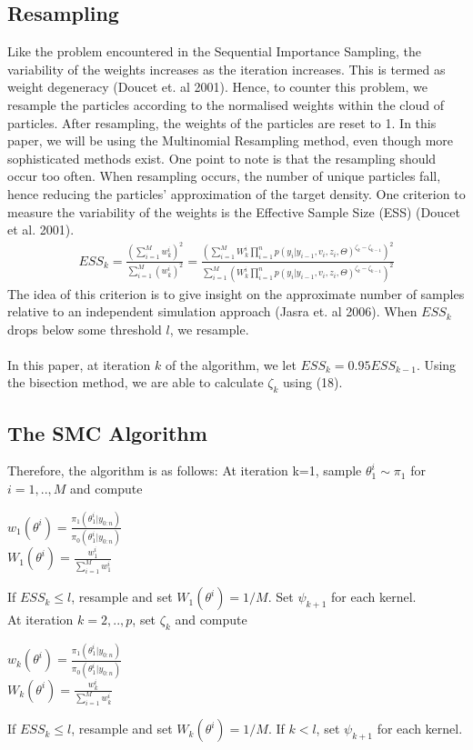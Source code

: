\documentclass[12pt]{article}
\theoremstyle{definition}
\begin{document}
\subsection{Resampling}
Like the problem encountered in the Sequential Importance Sampling, the variability of the weights increases as the iteration increases. This is termed as weight degeneracy (Doucet et. al 2001). Hence, to counter this problem, we resample the particles according to the normalised weights within the cloud of particles. After resampling, the weights of the particles are reset to 1. In this paper, we will be using the Multinomial Resampling method, even though more sophisticated methods exist. One point to note is that the resampling should occur too often. When resampling occurs, the number of unique particles fall, hence reducing the particles' approximation of the target density. One criterion to measure the variability of the weights is the Effective Sample Size (ESS) (Doucet et al. 2001). 
\begin{equation}
	\begin{aligned}
		ESS_{k} = \frac{(\sum_{i=1}^{M} w_{k}^{i})^{2}}{\sum_{i=1}^{M} (w_{k}^{i})^{2}}=
		\frac{(\sum_{i=1}^{M} W_{k}^{i} \prod_{i=1}^{n} p(y_{i}|y_{i-1},v_{i},z_{i},\Theta)^{\zeta_{k}-\zeta_{k-1}})^{2}}{\sum_{i=1}^{M} (W_{k}^{i}\prod_{i=1}^{n} p(y_{i}|y_{i-1},v_{i},z_{i},\Theta)^{\zeta_{k}-\zeta_{k-1}})^{2}}
	\end{aligned}
\end{equation}
The idea of this criterion is to give insight on the approximate number of samples relative to an independent simulation approach (Jasra et. al 2006). When $ESS_{k}$ drops below some threshold $l$, we resample. \\
\\
\noindent In this paper, at iteration $k$ of the algorithm, we let $ESS_{k}=0.95ESS_{k-1}$. Using the bisection method, we are able to calculate $\zeta_{k}$ using (18). 

\subsection{The SMC Algorithm}
Therefore, the algorithm is as follows:
At iteration k=1, sample $\theta_{1}^{i} \sim \pi_{1}$ for $i=1,..,M$ and compute\\
\begin{center}
$w_{1}(\theta^{i}) = \frac{\pi_{1}(\theta_{1}^{i}|y_{0:n})}{\pi_{0}(\theta_{1}^{i}|y_{0:n})}$\\
$W_{1}(\theta^{i}) = \frac{w_{1}^{i}}{\sum_{i=1}^{M} w_{1}^{i}}$
\end{center}
If $ESS_{k} \leqslant l$, resample and set $W_{1}(\theta^{i}) = 1/M$. Set $\psi_{k+1}$ for each kernel. \\
\noindent At iteration $k=2,..,p$, set $\zeta_{k}$ and compute
\begin{center}
$w_{k}(\theta^{i}) = \frac{\pi_{1}(\theta_{1}^{i}|y_{0:n})}{\pi_{0}(\theta_{1}^{i}|y_{0:n})}$\\
$W_{k}(\theta^{i}) = \frac{w_{k}^{i}}{\sum_{i=1}^{M} w_{k}^{i}}$
\end{center}
If $ESS_{k} \leqslant l$, resample and set $W_{k}(\theta^{i}) = 1/M$. If $k < l$, set $\psi_{k+1}$ for each kernel.
\end{document}
